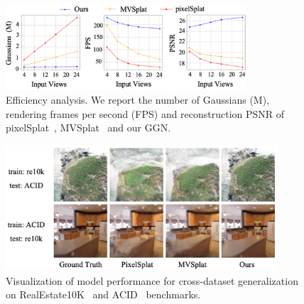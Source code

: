 \begin{table}[t]
    \centering
    \caption{Inference time comparison across different views. We train our model on 2 input views and report the inference time for 4 views, 8 views, and 16 views, respectively.}
    \vspace{0.2cm}
    \label{tab:inference time result}
\end{table}

\begin{figure}[t]
    \centering
    \includegraphics[width=0.8\textwidth]{fig/efficiency.png}
    \caption{Efficiency analysis. We report the number of Gaussians (M), rendering frames per second (FPS) and reconstruction PSNR of pixelSplat~\cite{pixelSplat2023arXiv}, MVSplat~\cite{MVSplat2024arXiv} and our GGN.}
    \label{fig: efficiency} 
    \vspace{-0.4cm}
\end{figure}

\begin{figure}[h]
    \centering
    \includegraphics[width=0.9\textwidth]{fig/cross_dataset_visual.png}
    \caption{Visualization of model performance for cross-dataset generalization on RealEstate10K~\cite{RealEstate10K2018} and ACID~\cite{ACID2021ICCV} benchmarks.}
    \label{fig: cross-dataset visual} 
    \vspace{-0.3cm}
\end{figure}

